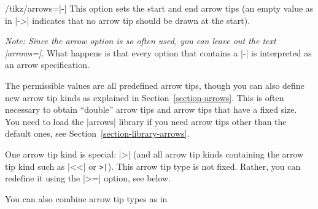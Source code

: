 \begin{key}{/tikz/arrows=|-|}
  This option sets the start and end arrow tips (an empty value as in |->|
  indicates that no arrow tip should be drawn at the start).%

  \emph{Note: Since the arrow option is so often used, you can leave
    out the text |arrows=|.} What happens is that every option that
  contains a |-| is interpreted as an arrow specification.

\begin{codeexample}[]
\end{codeexample}

  The permissible values are all predefined arrow tips, though
  you can also define new arrow tip kinds as explained in
  Section~\ref{section-arrows}. This is often necessary to obtain
  ``double'' arrow tips and arrow tips that have a fixed size. You
  need to load the |arrows| library if you need arrow tips other than
  the default ones, see Section~\ref{section-library-arrows}.

  One arrow tip kind is special: |>| (and all arrow tip kinds containing the
  arrow tip kind such as |<<| or \verb!>|!). This arrow tip type is not
  fixed. Rather, you can redefine it using the |>=| option, see
  below.

  \example You can also combine arrow tip types as in
\begin{codeexample}[]
\begin{tikzpicture}[thick]
  \draw[to reversed-to]   (0,0) .. controls +(.5,0) and +(-.5,-.5) .. +(1.5,1);
  \draw[[-latex reversed] (1,0) .. controls +(.5,0) and +(-.5,-.5) .. +(1.5,1);
  \draw[latex-)]          (2,0) .. controls +(.5,0) and +(-.5,-.5) .. +(1.5,1);
  \useasboundingbox (-.1,-.1) rectangle (3.1,1.1); %
\end{tikzpicture}
\end{codeexample}
\end{key}

